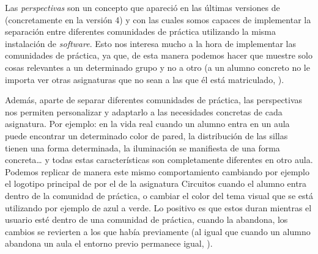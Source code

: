 Las \textit{perspectivas} son un concepto que apareció en las últimas versiones de \tiki{} (concretamente en la versión 4) y con las cuales somos capaces de implementar la separación entre diferentes comunidades de práctica utilizando la misma instalación de \textit{software}. Esto nos interesa mucho a la hora de implementar las comunidades de práctica, ya que, de esta manera podemos hacer que \tiki{} muestre solo cosas relevantes a un determinado grupo y no a otro (a un alumno concreto no le importa ver otras asignaturas que no sean a las que él está matriculado, ).

Además, aparte de separar diferentes comunidades de práctica, las perspectivas nos permiten personalizar \tiki{} y adaptarlo a las necesidades concretas de cada asignatura. Por ejemplo: en la vida real cuando un alumno entra en un aula puede encontrar un determinado color de pared, la distribución de las sillas tienen una forma determinada, la iluminación se manifiesta de una forma concreta\ldots{} y todas estas características son completamente diferentes en otro aula. Podemos replicar de manera  este mismo comportamiento cambiando por ejemplo el logotipo principal de \tiki{} por el de la asignatura Circuitos cuando el alumno entra dentro de la comunidad de práctica, o cambiar el color del tema visual que se está utilizando por ejemplo de azul a verde. Lo positivo es que estos  duran mientras el usuario esté dentro de una comunidad de práctica, cuando la abandona, los cambios se revierten a los que había previamente (al igual que cuando un alumno abandona un aula el entorno previo permanece igual, ).

